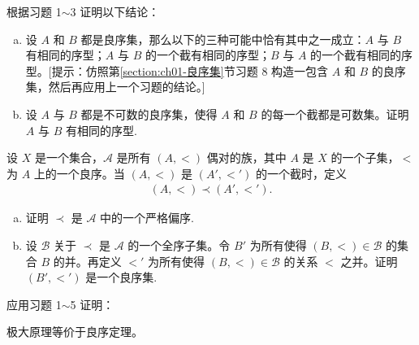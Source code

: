 \documentclass[../../main.tex]{subfiles}
\begin{document}
\begin{exercise}\label{exercise:ch01-附加良序-4}
根据习题 1$\sim$3 证明以下结论：
\begin{enumerate}[(a)]
\item 设 $A$ 和 $B$ 都是良序集，那么以下的三种可能中恰有其中之一成立：$A$ 与 $B$ 有相同的序型；$A$ 与 $B$ 的一个截有相同的序型；$B$ 与 $A$ 的一个截有相同的序型。[提示：仿照第\cref{section:ch01-良序集}节习题 8 构造一包含 $A$ 和 $B$ 的良序集，然后再应用上一个习题的结论。]
\item 设 $A$ 与 $B$ 都是不可数的良序集，使得 $A$ 和 $B$ 的每一个截都是可数集。证明 $A$ 与 $B$ 有相同的序型.
\end{enumerate}
\end{exercise}

\begin{exercise}\label{exercise:ch01-附加良序-5}
设 $X$ 是一个集合，$\mathcal{A}$ 是所有 $(A, <)$ 偶对的族，其中 $A$ 是 $X$ 的一个子集，$<$ 为 $A$ 上的一个良序。当 $(A, <)$ 是 $(A', <')$ 的一个截时，定义
\begin{align*}
(A, <) \prec (A', <').
\end{align*}
\begin{enumerate}[(a)]
\item 证明 $\prec$ 是 $\mathcal{A}$ 中的一个严格偏序.
\item 设 $\mathcal{B}$ 关于 $\prec$ 是 $\mathcal{A}$ 的一个全序子集。令 $B'$ 为所有使得 $(B, <) \in \mathcal{B}$ 的集合 $B$ 的并。再定义 $<'$ 为所有使得 $(B, <) \in \mathcal{B}$ 的关系 $<$ 之并。证明 $(B', <')$ 是一个良序集.
\end{enumerate}
\end{exercise}

\begin{exercise}\label{exercise:ch01-附加良序-6}
应用习题 1$\sim$5 证明：

\begin{theorem}[极大原理等价于良序定理]\label{theorem:ch01-极大等价良序}
极大原理等价于良序定理。
\end{theorem}
\end{exercise}
\end{document}
